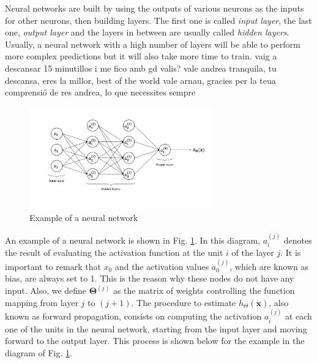 \documentclass[a4paper, report, oneside, UKenglish]{memoir}
\newcommand{\x}{\boldsymbol{x}}
\newcommand{\bTheta}{\boldsymbol{\Theta}}
\begin{document}
Neural networks are built by using the outputs of various neurons as the inputs for other neurons, then building layers. The first one is called \textit{input layer}, the last one, \textit{output layer} and the layers in between are usually called \textit{hidden layers}. Usually, a neural network with a high number of layers will be able to perform more complex predictions but it will also take more time to train.
vaig a descansar 15 minutillos i me fico amb gd valis? vale andrea tranquila, tu descansa, eres la millor, best of the world
vale arnau, gracies per la teua comprensió
de res andrea, lo que necessites sempre
\begin{figure}[ht]
    \centering
    \includegraphics[width=0.7\textwidth]{figures/fitting/neural_network_example.png}
    \caption{Example of a neural network}
    \label{fig:neural_network_example}
\end{figure}

An example of a neural network is shown in Fig. \ref{fig:neural_network_example}. In this diagram, $a_i^{(j)}$ denotes the result of evaluating the activation function at the unit $i$ of the layer $j$. It is important to remark that $x_0$ and the activation values $a_0^{(j)}$, which are known as bias, are always set to 1. This is the reason why these nodes do not have any input. Also, we define $\bTheta^{(j)}$ as the matrix of weights controlling the function mapping from layer $j$ to $(j+1)$. The procedure to estimate $h_\Theta(\x)$, also known as forward propagation, consists on computing the activation $a_i^{(j)}$ at each one of the units in the neural network, starting from the input layer and moving forward to the output layer. This process is shown below for the example in the diagram of Fig. \ref{fig:neural_network_example}.
\end{document}

